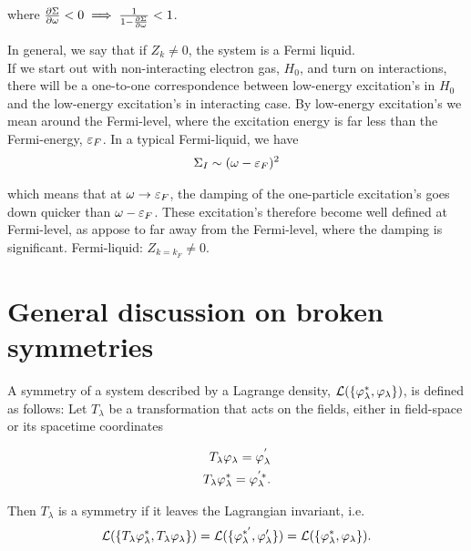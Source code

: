 where $\pdv{\Sigma}{\omega} < 0 \implies \frac{1}{1 - \pdv{\Sigma}{\omega}} < 1$. 

\begin{figure}
	\centering

\end{figure}

In general, we say that if $Z_k \neq 0$, the system is a Fermi liquid. \\ 

If we start out with non-interacting electron gas, $H_0$, and turn on interactions, there will be a one-to-one correspondence between low-energy excitation's in $H_0$ and the low-energy excitation's in interacting case. By low-energy excitation's we mean around the Fermi-level, where the excitation energy is far less than the Fermi-energy, $\varepsilon_F$. In a typical Fermi-liquid, we have \\ 

\begin{align*}
    \Sigma_I \sim (\omega - \varepsilon_F)^2 
\end{align*}

which means that at $\omega \to \varepsilon_F$, the damping of the one-particle excitation's goes down quicker than $\omega - \varepsilon_F$. These excitation's therefore become well defined at Fermi-level, as appose to far away from the Fermi-level, where the damping is significant. Fermi-liquid: $Z_{k = k_F} \neq 0$. \\

\section{General discussion on broken symmetries}

A symmetry of a system described by a Lagrange density, $\mathcal{L}(\{\varphi_\lambda^*, \varphi_\lambda\})$, is defined as follows: Let $T_\lambda$ be a transformation that acts on the fields, either in field-space or its spacetime coordinates

\begin{align*}
    T_\lambda \varphi_\lambda = \varphi_\lambda^{'} \\ 
    T_\lambda \varphi_\lambda^* = \varphi_\lambda^{'*}. 
\end{align*}

Then $T_\lambda$ is a symmetry if it leaves the Lagrangian invariant, i.e. \\ 

\begin{align*}
    \mathcal{L}(\{T_\lambda \varphi_\lambda^*, T_\lambda \varphi_\lambda\}) = \mathcal{L}(\{\varphi_\lambda^{*'}, \varphi_\lambda'\}) = \mathcal{L}(\{\varphi_\lambda^*, \varphi_\lambda\}).
\end{align*}

